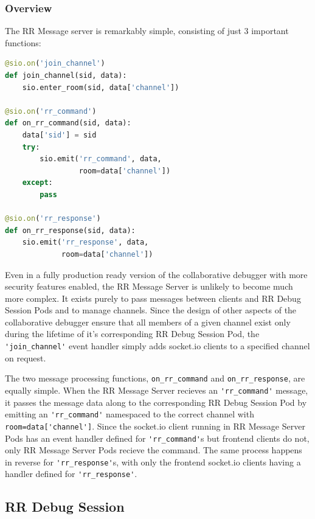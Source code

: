 \documentclass[12pt]{article}
\begin{document}
\subsubsection{Overview}

The RR Message server is remarkably simple, consisting of just 3
important functions:

\begin{lstlisting}[language=Python,basicstyle=\linespread{0.5}\ttfamily,caption={RR Message Server},captionpos=b]
@sio.on('join_channel')
def join_channel(sid, data):
    sio.enter_room(sid, data['channel'])

@sio.on('rr_command')
def on_rr_command(sid, data):
    data['sid'] = sid
    try:
        sio.emit('rr_command', data,
                 room=data['channel'])
    except:
        pass

@sio.on('rr_response')
def on_rr_response(sid, data):
    sio.emit('rr_response', data,
             room=data['channel'])
\end{lstlisting}

Even in a fully production ready version of the collaborative debugger
with more security features enabled, the RR Message Server is unlikely
to become much more complex.  It exists purely to pass messages
between clients and RR Debug Session Pods and to manage channels.
Since the design of other aspects of the collaborative debugger ensure
that all members of a given channel exist only during the lifetime of
it's corresponding RR Debug Session Pod, the
\lstinline{'join_channel'} event handler simply adds socket.io clients
to a specified channel on request.
\par

The two message processing functions, \lstinline{on_rr_command} and
\lstinline{on_rr_response}, are equally simple.  When the RR Message
Server recieves an \lstinline{'rr_command'} message, it passes the
message data along to the corresponding RR Debug Session Pod by
emitting an \lstinline{'rr_command'} namespaced to the correct channel
with \lstinline{room=data['channel']}.  Since the socket.io client
running in RR Message Server Pods has an event handler defined for
\lstinline{'rr_command'}s but frontend clients do not, only RR Message
Server Pods recieve the command.  The same process happens in reverse
for \lstinline{'rr_response'}s, with only the frontend socket.io
clients having a handler defined for \lstinline{'rr_response'}.

\subsection{RR Debug Session} \label{rrpods}
\end{document}
